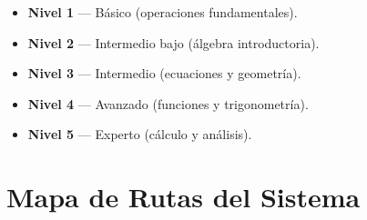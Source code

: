 \documentclass[12pt, a4paper, oneside]{book}
\begin{document}
\begin{enumerate}[leftmargin=2em, label=\textcolor{yt-orange}{\textbf{Q\arabic*.}}]
    \begin{itemize}
        \item \textbf{Nivel 1} — Básico (operaciones fundamentales).
        \item \textbf{Nivel 2} — Intermedio bajo (álgebra introductoria).
        \item \textbf{Nivel 3} — Intermedio (ecuaciones y geometría).
        \item \textbf{Nivel 4} — Avanzado (funciones y trigonometría).
        \item \textbf{Nivel 5} — Experto (cálculo y análisis).
    \end{itemize}

\end{enumerate}


\appendix
\chapter{Mapa de Rutas del Sistema}
\end{document}
